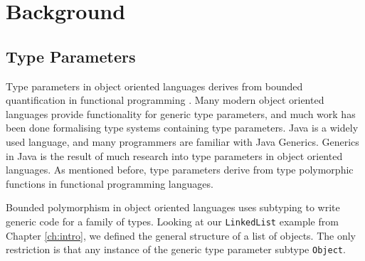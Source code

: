 \documentclass[11pt
              , a4paper
              , twoside
              , openright
              ]{report}
\numberwithin{case}{theorem}
\numberwithin{subcase}{case}
\begin{document}
\chapter{Background}\label{ch:background}

\section{Type Parameters}
Type parameters in object oriented languages derives from bounded quantification in functional programming \cite{Cardelli:1985:UTD:6041.6042, Canning:1989:FPO:99370.99392}. Many modern object oriented languages provide functionality for generic type parameters, and much work has been done formalising type systems containing type parameters. Java is a widely used language, and many programmers are familiar with Java Generics. Generics in Java is the result of much research into type parameters in object oriented languages. As mentioned before, type parameters derive from type polymorphic functions in functional programming languages.

Bounded polymorphism in object oriented languages uses subtyping to write generic code for a family of types. Looking at our \verb|LinkedList| example from Chapter \ref{ch:intro}, we defined the general structure of a list of objects. The only restriction is that any instance of the generic type parameter subtype \verb|Object|.
\end{document}
